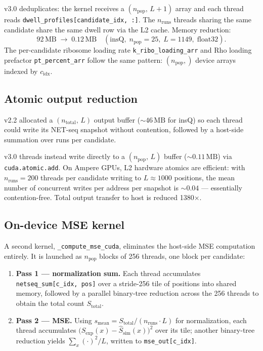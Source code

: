 \documentclass[11pt]{article}
\begin{document}
v3.0 deduplicates: the kernel receives a $(n_{\text{pop}},\, L+1)$ array
and each thread reads \texttt{dwell\_profiles[candidate\_idx, :]}. The
$n_{\text{runs}}$ threads sharing the same candidate share the same dwell
row via the L2 cache. Memory reduction:
\begin{equation}
  92\,\text{MB} \;\longrightarrow\; 0.12\,\text{MB} \quad (\text{insQ},
  \; n_{\text{pop}}=25, \; L=1149, \; \text{float32}).
\end{equation}
The per-candidate ribosome loading rate \texttt{k\_ribo\_loading\_arr} and
Rho loading prefactor \texttt{pt\_percent\_arr} follow the same pattern:
$(n_{\text{pop}},)$ device arrays indexed by $c_{\text{idx}}$.

\subsection{Atomic output reduction}

v2.2 allocated a $(n_{\text{total}},\, L)$ output buffer ($\sim 46\,\text{MB}$
for insQ) so each thread could write its NET-seq snapshot without contention,
followed by a host-side summation over runs per candidate.

v3.0 threads instead write directly to a $(n_{\text{pop}},\, L)$ buffer
($\sim 0.11\,\text{MB}$) via \texttt{cuda.atomic.add}. On Ampere GPUs, L2
hardware atomics are efficient: with $n_{\text{runs}} = 200$ threads per
candidate writing to $L \approx 1000$ positions, the mean number of
concurrent writes per address per snapshot is $\sim 0.04$ — essentially
contention-free. Total output transfer to host is reduced 1380$\times$.

\subsection{On-device MSE kernel}

A second kernel, \texttt{\_compute\_mse\_cuda}, eliminates the host-side MSE
computation entirely. It is launched as $n_{\text{pop}}$ blocks of 256
threads, one block per candidate:

\begin{enumerate}
  \item \textbf{Pass 1 — normalization sum.} Each thread accumulates
    \texttt{netseq\_sum[c\_idx, pos]} over a stride-256 tile of positions
    into shared memory, followed by a parallel binary-tree reduction across
    the 256 threads to obtain the total count $S_{\text{total}}$.

  \item \textbf{Pass 2 — MSE.} Using $s_{\text{mean}} =
    S_{\text{total}} / (n_{\text{runs}} \cdot L)$ for normalization, each
    thread accumulates $\bigl(S_{\text{exp}}(x) -
    \hat{S}_{\text{sim}}(x)\bigr)^2$ over its tile; another binary-tree
    reduction yields $\sum_x (\cdot)^2 / L$, written to
    \texttt{mse\_out[c\_idx]}.
\end{enumerate}
\end{document}
